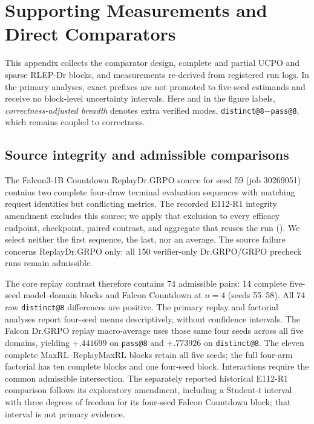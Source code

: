 \documentclass{article}
\newcommand{\1}{\mathbf 1}
\theoremstyle{remark}
\theoremstyle{definition}
\theoremstyle{plain}
\begin{document}
\section{Supporting Measurements and Direct Comparators}
\label{app:supporting}

This appendix collects the comparator design, complete and partial UCPO and
sparse RLEP-Dr blocks, and measurements re-derived from
registered run logs. In the primary analyses, exact prefixes are not promoted
to five-seed estimands and receive no block-level uncertainty intervals. Here and in the figure
labels, \emph{correctness-adjusted breadth} denotes extra verified modes,
\texttt{distinct@8}$-$\texttt{pass@8}, which remains coupled to correctness.

\subsection{Source integrity and admissible comparisons}
\label{app:source-integrity}

The Falcon3-1B Countdown ReplayDr.GRPO source for seed 59 (job 30269051)
contains two complete four-draw terminal evaluation sequences with matching
request identities but conflicting metrics. The recorded E112-R1 integrity
amendment excludes this source; we apply that exclusion to every efficacy
endpoint, checkpoint, paired contrast, and aggregate that reuses the run
().
We select neither the first sequence, the last, nor an average. The source
failure concerns ReplayDr.GRPO only: all 150 verifier-only Dr.GRPO/GRPO
precheck runs remain admissible.

The core replay contrast therefore contains 74 admissible pairs: 14 complete
five-seed model--domain blocks and Falcon Countdown at $n=4$ (seeds 55--58).
All 74 raw \texttt{distinct@8} differences are positive. The primary replay
and factorial analyses report four-seed means descriptively, without
confidence intervals. The Falcon
Dr.GRPO replay macro-average uses those same four seeds across all five
domains, yielding $+.441699$ on \texttt{pass@8} and $+.773926$ on
\texttt{distinct@8}. The eleven complete MaxRL--ReplayMaxRL blocks retain all
five seeds; the full four-arm factorial has ten complete blocks and one
four-seed block. Interactions require the common admissible intersection. The separately
reported historical E112-R1 comparison follows its exploratory amendment,
including a Student-$t$ interval with three degrees of freedom for its
four-seed Falcon Countdown block; that interval is not primary evidence.
\end{document}
